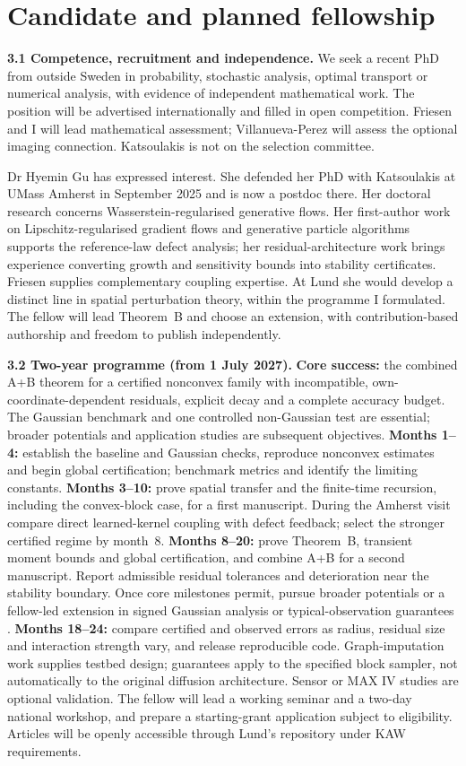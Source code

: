 \documentclass[12pt,a4paper]{article}
\begin{document}
\section{Candidate and planned fellowship}
\textbf{3.1 Competence, recruitment and independence.}
We seek a recent PhD from outside Sweden in probability, stochastic analysis, optimal transport or numerical analysis, with evidence of independent mathematical work. The position will be advertised internationally and filled in open competition. Friesen and I will lead mathematical assessment; Villanueva-Perez will assess the optional imaging connection. Katsoulakis is not on the selection committee.

Dr Hyemin Gu has expressed interest. She defended her PhD with Katsoulakis at UMass Amherst in September 2025 and is now a postdoc there. Her doctoral research concerns Wasserstein-regularised generative flows. Her first-author work on Lipschitz-regularised gradient flows and generative particle algorithms \cite{GBPRK24} supports the reference-law defect analysis; her residual-architecture work \cite{GTSK26} brings experience converting growth and sensitivity bounds into stability certificates. Friesen supplies complementary coupling expertise. At Lund she would develop a distinct line in spatial perturbation theory, within the programme I formulated. The fellow will lead Theorem~B and choose an extension, with contribution-based authorship and freedom to publish independently.

\textbf{3.2 Two-year programme (from 1 July 2027).}
\textbf{Core success:} the combined A+B theorem for a certified nonconvex family with incompatible, own-coordinate-dependent residuals, explicit decay and a complete accuracy budget. The Gaussian benchmark and one controlled non-Gaussian test are essential; broader potentials and application studies are subsequent objectives.
\textbf{Months 1--4:} establish the baseline and Gaussian checks, reproduce nonconvex estimates and begin global certification; benchmark metrics and identify the limiting constants.
\textbf{Months 3--10:} prove spatial transfer and the finite-time recursion, including the convex-block case, for a first manuscript. During the Amherst visit compare direct learned-kernel coupling with defect feedback; select the stronger certified regime by month~8.
\textbf{Months 8--20:} prove Theorem~B, transient moment bounds and global certification, and combine A+B for a second manuscript. Report admissible residual tolerances and deterioration near the stability boundary. Once core milestones permit, pursue broader potentials or a fellow-led extension in signed Gaussian analysis or typical-observation guarantees \cite{vdBM94}.
\textbf{Months 18--24:} compare certified and observed errors as radius, residual size and interaction strength vary, and release reproducible code. Graph-imputation work supplies testbed design; guarantees apply to the specified block sampler, not automatically to the original diffusion architecture. Sensor or MAX IV studies are optional validation. The fellow will lead a working seminar and a two-day national workshop, and prepare a starting-grant application subject to eligibility. Articles will be openly accessible through Lund's repository under KAW requirements.
\end{document}
